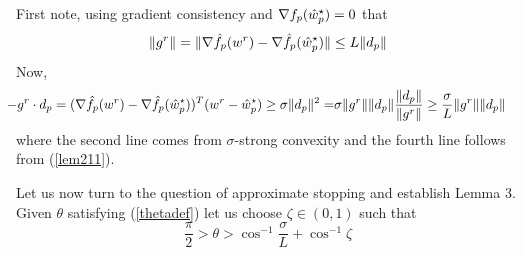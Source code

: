 \documentclass[twoside, 11pt]{article}
\begin{document}
\vspace*{0.1in}

 First note, using gradient consistency and $\nabla f_p(\hat{w}_p^\star)=0$ that
\begin{equation}
\|g^r\| = \| \nabla \hat{f}_p(w^r)-\nabla \hat{f}_p(\hat{w}_p^\star) \| \le L\|d_p\|
\label{lem211}
\end{equation}
Now,
\begin{eqnarray}
\hspace*{-0.1in}
-g^r\cdot d_p = (\grad \fhat_p(w^r)-\grad \fhat_p(\what_p^\star))^T(w^r-\what_p^\star)
            \ge \sigma \|d_p\|^2
            =&\sigma \|g^r\| \|d_p\| \frac{\|d_p\|}{\|g^r\|}
            \ge \frac{\sigma}{L} \|g^r\| \|d_p\|
\label{lem212}
\end{eqnarray}
where the second line comes from $\sigma$-strong convexity and the fourth line follows from (\ref{lem211}).

\vspace*{0.1in}

Let us now turn to the question of approximate stopping and establish Lemma 3. Given $\theta$ satisfying (\ref{thetadef}) let us choose $\zeta\in (0,1)$ such that
\begin{equation}
\label{lem2211}
\frac{\pi}{2} > \theta > \cos^{-1} \frac{\sigma}{L} + \cos^{-1} \zeta
\end{equation}


\end{document}

